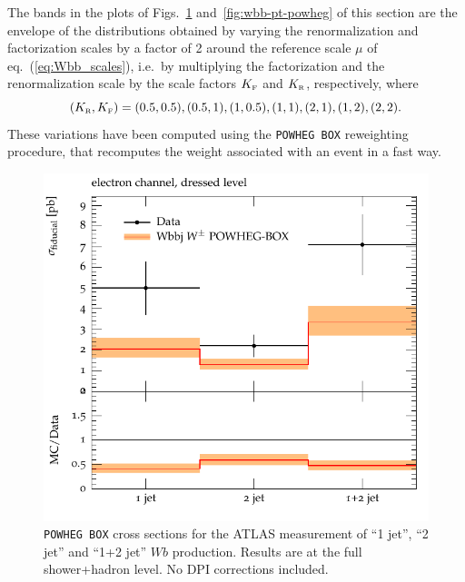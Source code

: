 \documentclass[11pt]{cernrep}
\newcommand\KRA{K_{\scriptscriptstyle \rm R}}
\newcommand\KFA{K_{\scriptscriptstyle \rm F}}
\newcommand\POWHEGBOX{{\tt POWHEG BOX}}
\begin{document}
\begin{enumerate}
The bands in the plots of Figs.~\ref{fig:wbb-njet-powheg}
and~\ref{fig:wbb-pt-powheg} of this section are the envelope of the
distributions obtained by varying the renormalization and factorization
scales by a factor of 2 around the reference scale $\mu$ of
eq.~(\ref{eq:Wbb_scales}), i.e.~by multiplying the factorization and the
renormalization scale by the scale factors $\KFA$ and $\KRA$, respectively,
where
\begin{equation}
\label{eq:KRA_KFA}
(\KRA,\KFA)=(0.5,0.5),  (0.5,1), (1,0.5), (1,1),(2,1),(1,2),(2,2).
\end{equation}
These variations have been computed using the \POWHEGBOX{} reweighting
procedure, that recomputes the weight associated with an event in a fast way.
\end{enumerate}

\begin{figure}[htbp]
\begin{center}
   \includegraphics[scale=0.65]{figs/wbb/powheg/d01-x01-y01.pdf}
\end{center}
\caption{\POWHEGBOX{} cross sections for the ATLAS measurement of ``1 jet'',
  ``2 jet'' and ``1+2 jet'' $Wb$ production.  Results are at the full
  shower+hadron level.  No DPI corrections included. }
\label{fig:wbb-njet-powheg}
\end{figure}
\end{document}

